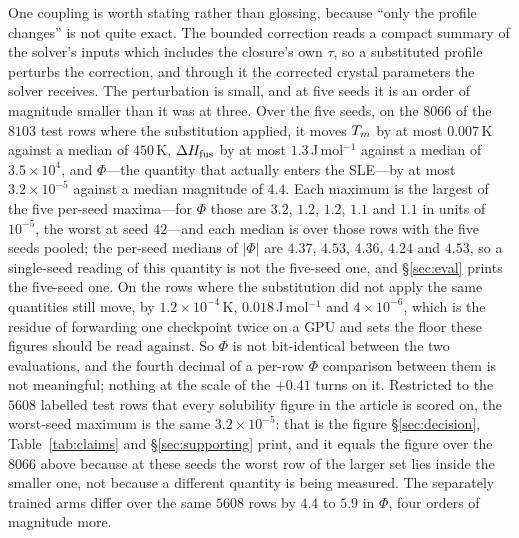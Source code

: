 One coupling is worth stating rather than glossing, because ``only the profile changes'' is not
quite exact. The bounded correction reads a compact summary of the solver's inputs which includes
the closure's own $\tau$, so a substituted profile perturbs the correction, and through it the
corrected crystal parameters the solver receives. The perturbation is small, and at five seeds it is an order of magnitude smaller than it was at
three. Over the five seeds,
on the $8066$ of the $8103$ test rows where the substitution applied, it moves $T_m$ by at most
$0.007$\,K against a median of
$450$\,K, $\Delta H_{\mathrm{fus}}$ by at most $1.3$\,J\,mol$^{-1}$ against a median of $3.5\times10^{4}$, and
$\Phi$---the quantity that actually enters the SLE---by at most $3.2\times10^{-5}$ against a median
magnitude of $4.4$. Each maximum is the largest of the five per-seed maxima---for $\Phi$ those are
$3.2$, $1.2$, $1.2$, $1.1$ and $1.1$ in units of $10^{-5}$, the worst at seed $42$---and each median
is over those rows with the five seeds pooled; the per-seed medians of $|\Phi|$ are $4.37$, $4.53$,
$4.36$, $4.24$ and $4.53$, so
a single-seed reading of this quantity is not the five-seed one, and \S\ref{sec:eval} prints the
five-seed one.
On the rows where the substitution did not apply the same quantities still move,
by $1.2\times10^{-4}$\,K, $0.018$\,J\,mol$^{-1}$ and $4\times10^{-6}$, which is the residue of
forwarding one checkpoint twice on a GPU and sets the floor these figures should be read against. So
$\Phi$ is not bit-identical between the two evaluations, and the fourth decimal of a per-row
$\Phi$ comparison between them is not meaningful; nothing at the scale of the $+0.41$ turns on it.
Restricted to the $5608$ labelled test rows that every solubility figure in the article is scored on,
the worst-seed maximum is the same $3.2\times10^{-5}$: that is the figure \S\ref{sec:decision},
Table~\ref{tab:claims} and \S\ref{sec:supporting} print, and it equals the figure over the $8066$
above because at these seeds the worst row of the larger set lies inside the smaller one, not
because a different quantity is being measured. The separately trained arms differ over the same $5608$ rows by $4.4$ to $5.9$ in $\Phi$,
four orders of magnitude more.

